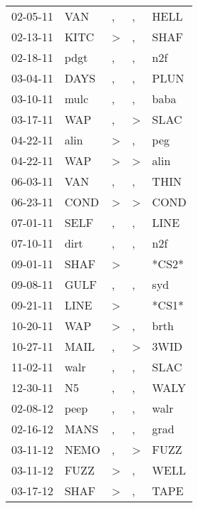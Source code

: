 \begin{supertabular}{lllll}
 02-05-11 &    VAN &                , &                , &   HELL \\
 02-13-11 &   KITC &     \textgreater &                , &   SHAF \\
 02-18-11 &   pdgt &                , &                , &    n2f \\
 03-04-11 &   DAYS &                , &                , &   PLUN \\
 03-10-11 &   mulc &                , &                , &   baba \\
 03-17-11 &    WAP &                , &     \textgreater &   SLAC \\
 04-22-11 &   alin &     \textgreater &                , &    peg \\
 04-22-11 &    WAP &     \textgreater &     \textgreater &   alin \\
 06-03-11 &    VAN &                , &                , &   THIN \\
 06-23-11 &   COND &     \textgreater &     \textgreater &   COND \\
 07-01-11 &   SELF &                , &                , &   LINE \\
 07-10-11 &   dirt &                , &                , &    n2f \\
 09-01-11 &   SHAF &     \textgreater &                  &  *CS2* \\
 09-08-11 &   GULF &                , &                , &    syd \\
 09-21-11 &   LINE &     \textgreater &                  &  *CS1* \\
 10-20-11 &    WAP &     \textgreater &                , &   brth \\
 10-27-11 &   MAIL &                , &     \textgreater &   3WID \\
 11-02-11 &   walr &                , &                , &   SLAC \\
 12-30-11 &     N5 &                , &                , &   WALY \\
 02-08-12 &   peep &                , &                , &   walr \\
 02-16-12 &   MANS &                , &                , &   grad \\
 03-11-12 &   NEMO &                , &     \textgreater &   FUZZ \\
 03-11-12 &   FUZZ &     \textgreater &                , &   WELL \\
 03-17-12 &   SHAF &     \textgreater &                , &   TAPE \\

\end{supertabular}
